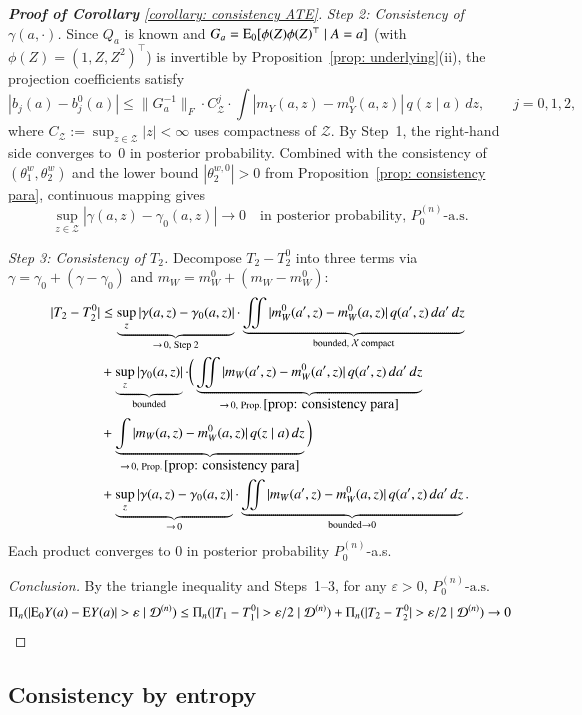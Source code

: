 \begin{proof}[\hypertarget{proof of corollary}{\textbf{Proof of Corollary}} \ref{corollary: consistency ATE}]
\medskip
\noindent\textit{Step 2: Consistency of $\gamma(a,\cdot)$.}
Since $Q_a$ is known and $G_a=\mathrm{E}_0[\phi(Z)\phi(Z)^\top\mid A=a]$ (with $\phi(Z)=(1,Z,Z^2)^\top$) is invertible by Proposition~\ref{prop: underlying}(ii), the projection coefficients satisfy
\[
|b_j(a)-b_j^0(a)|
\leq
\|G_a^{-1}\|_F\cdot C_{\mathcal{Z}}^j\cdot\int|m_Y(a,z)-m_Y^0(a,z)|\,q(z\mid a)\,dz,
\qquad j=0,1,2,
\]
where $C_{\mathcal{Z}}:=\sup_{z\in\mathcal{Z}}|z|<\infty$ uses compactness of $\mathcal{Z}$. By Step~1, the right-hand side converges to~$0$ in posterior probability. Combined with the consistency of $(\theta_1^w,\theta_2^w)$ and the lower bound $|\theta_2^{w,0}|>0$ from Proposition~\ref{prop: consistency para}, continuous mapping gives
\[
\sup_{z\in\mathcal{Z}}|\gamma(a,z)-\gamma_0(a,z)|\to 0
\quad \text{in posterior probability, }P_0^{(n)}\text{-a.s.}
\]

\medskip
\noindent\textit{Step 3: Consistency of $T_2$.}
Decompose $T_2-T_2^0$ into three terms via $\gamma=\gamma_0+(\gamma-\gamma_0)$ and $m_W=m_W^0+(m_W-m_W^0)$:
\begin{align*}
|T_2-T_2^0|
&\leq
\underbrace{\sup_{z}|\gamma(a,z)-\gamma_0(a,z)|}_{\to\,0,\;\text{Step 2}}
\cdot
\underbrace{\iint|m_W^0(a',z)-m_W^0(a,z)|\,q(a',z)\,da'\,dz}_{\text{bounded, }\mathcal{X}\text{ compact}}
\\
&+
\underbrace{\sup_{z}|\gamma_0(a,z)|}_{\text{bounded}}
\cdot
\bigg(
\underbrace{\iint|m_W(a',z)-m_W^0(a',z)|\,q(a',z)\,da'\,dz}_{\to\,0,\;\text{Prop.}\,\ref{prop: consistency para}}\\
&+
\underbrace{\int|m_W(a,z)-m_W^0(a,z)|\,q(z\mid a)\,dz}_{\to\,0,\;\text{Prop.}\,\ref{prop: consistency para}}
\bigg)
\\
&+
\underbrace{\sup_{z}|\gamma(a,z)-\gamma_0(a,z)|}_{\to\,0}
\cdot\underbrace{\iint|m_W(a',z)-m_W^0(a,z)|\,q(a',z)\,da'\,dz}_{\text{bounded}\to 0}.
\end{align*}
Each product converges to $0$ in posterior probability $P_0^{(n)}$-a.s.

\medskip
\noindent\textit{Conclusion.}
By the triangle inequality and Steps~1--3, for any $\varepsilon>0$, $P_0^{(n)}\text{-a.s.}$
\[
\Pi_n(|\ex_0 Y(a)-\ex Y(a)|>\varepsilon\mid\mathcal{D}^{(n)})
\leq
\Pi_n(|T_1-T_1^0|>\varepsilon/2\mid\mathcal{D}^{(n)})
+
\Pi_n(|T_2-T_2^0|>\varepsilon/2\mid\mathcal{D}^{(n)})
\to 0
\]
\qedhere
\end{proof}

\subsection{Consistency by entropy}

